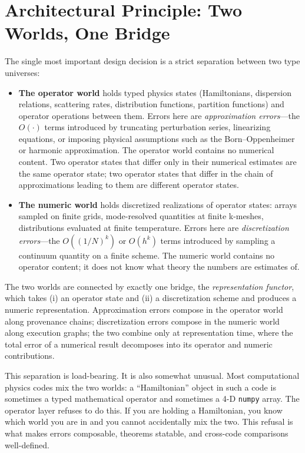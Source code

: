 \documentclass[11pt,a4paper]{article}
\newcommand{\abstr}[1]{\textcolor{abstrcol}{#1}}
\newcommand{\numr}[1]{\textcolor{numcol}{#1}}
\begin{document}
\section{Architectural Principle: Two Worlds, One Bridge}
\label{sec:principle}

The single most important design decision is a strict separation between two type universes:

\begin{itemize}[leftmargin=2em]
  \item \abstr{\textbf{The operator world}} holds typed physics states (Hamiltonians, dispersion
        relations, scattering rates, distribution functions, partition functions) and operator
        operations between them. Errors here are \emph{approximation errors}---the $O(\cdot)$
        terms introduced by truncating perturbation series, linearizing equations, or imposing
        physical assumptions such as the Born--Oppenheimer or harmonic approximation. The
        operator world contains no numerical content. Two operator states that differ only in
        their numerical estimates are the same operator state; two operator states that differ
        in the chain of approximations leading to them are different operator states.
  \item \numr{\textbf{The numeric world}} holds discretized realizations of operator states:
        arrays sampled on finite grids, mode-resolved quantities at finite k-meshes,
        distributions evaluated at finite temperature. Errors here are \emph{discretization
        errors}---the $O((1/N)^k)$ or $O(h^k)$ terms introduced by sampling a continuum quantity
        on a finite scheme. The numeric world contains no operator content; it does not know
        what theory the numbers are estimates of.
\end{itemize}

The two worlds are connected by exactly one bridge, the \emph{representation functor}, which
takes (i) an operator state and (ii) a discretization scheme and produces a numeric
representation. Approximation errors compose in the operator world along provenance chains;
discretization errors compose in the numeric world along execution graphs; the two combine only
at representation time, where the total error of a numerical result decomposes into its operator
and numeric contributions.

This separation is load-bearing. It is also somewhat unusual. Most computational physics codes
mix the two worlds: a ``Hamiltonian'' object in such a code is sometimes a typed mathematical
operator and sometimes a 4-D \texttt{numpy} array. The operator layer refuses to do this. If you are
holding a Hamiltonian, you know which world you are in and you cannot
accidentally mix the two. This refusal is what makes errors composable, theorems statable, and
cross-code comparisons well-defined.
\end{document}
